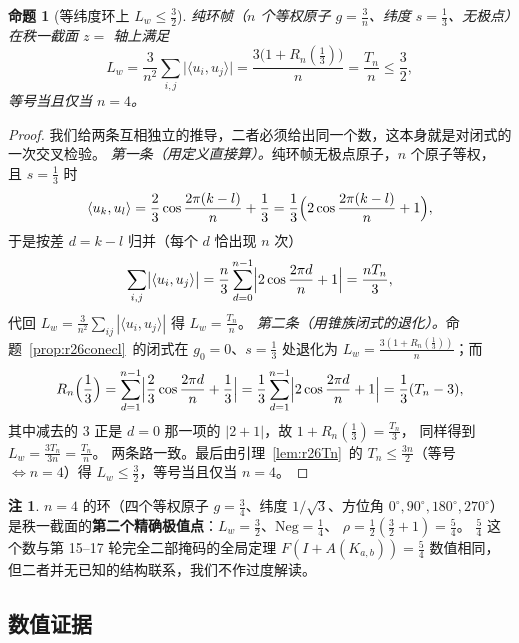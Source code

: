 \documentclass[UTF8,11pt]{ctexart}
\newtheorem{proposition}[theorem]{命题}
\theoremstyle{definition}
\newtheorem{remark}[theorem]{注}
\begin{document}
\begin{proposition}[等纬度环上 $L_w\le\frac32$]\label{prop:r26ring}
纯环帧（$n$ 个等权原子 $g=\frac3n$、纬度 $s=\frac13$、无极点）在秩一截面 $z=$ 轴上满足
\begin{equation}\label{eq:r26ring}
L_w=\frac{3}{n^2}\sum_{i,j}\bigl|\langle u_i,u_j\rangle\bigr|
=\frac{3\bigl(1+R_n(\frac13)\bigr)}{n}
=\frac{T_n}{n}\le\frac32 ,
\end{equation}
等号当且仅当 $n=4$。
\end{proposition}

\begin{proof}
我们给两条互相独立的推导，二者必须给出同一个数，这本身就是对闭式的一次交叉检验。
\emph{第一条（用定义直接算）。}纯环帧无极点原子，$n$ 个原子等权，
且 $s=\frac13$ 时
\[
\langle u_k,u_l\rangle=\frac23\cos\frac{2\pi(k-l)}n+\frac13
=\frac13\Bigl(2\cos\frac{2\pi(k-l)}n+1\Bigr),
\]
于是按差 $d=k-l$ 归并（每个 $d$ 恰出现 $n$ 次）
\[
\sum_{i,j}\bigl|\langle u_i,u_j\rangle\bigr|
=\frac n3\sum_{d=0}^{n-1}\Bigl|2\cos\frac{2\pi d}n+1\Bigr|=\frac{nT_n}3 ,
\]
代回 $L_w=\frac3{n^2}\sum_{ij}|\langle u_i,u_j\rangle|$ 得 $L_w=\frac{T_n}n$。
\emph{第二条（用锥族闭式的退化）。}命题~\ref{prop:r26conecl}~的闭式在 $g_0=0$、$s=\frac13$ 处退化为
$L_w=\frac{3(1+R_n(\frac13))}n$；而
\[
R_n\Bigl(\frac13\Bigr)=\sum_{d=1}^{n-1}\Bigl|\frac23\cos\frac{2\pi d}n+\frac13\Bigr|
=\frac13\sum_{d=1}^{n-1}\Bigl|2\cos\frac{2\pi d}n+1\Bigr|=\frac13(T_n-3),
\]
其中减去的 $3$ 正是 $d=0$ 那一项的 $|2+1|$，故 $1+R_n(\frac13)=\frac{T_n}3$，
同样得到 $L_w=\frac{3T_n}{3n}=\frac{T_n}n$。
两条路一致。最后由引理~\ref{lem:r26Tn}~的 $T_n\le\frac{3n}2$（等号 $\iff n=4$）得
$L_w\le\frac32$，等号当且仅当 $n=4$。
\end{proof}

\begin{remark}
$n=4$ 的环（四个等权原子 $g=\frac34$、纬度 $1/\sqrt3$、方位角 $0^\circ,90^\circ,180^\circ,270^\circ$）
是秩一截面的\textbf{第二个精确极值点}：$L_w=\frac32$、$\mathrm{Neg}=\frac14$、
$\rho=\frac12(\frac32+1)=\frac54$。
$\frac54$ 这个数与第 15--17 轮完全二部掩码的全局定理 $F(I+A(K_{a,b}))=\frac54$
数值相同，但二者并无已知的结构联系，我们不作过度解读。
\end{remark}

\subsection{数值证据}\label{sec:r26:num}
\end{document}
